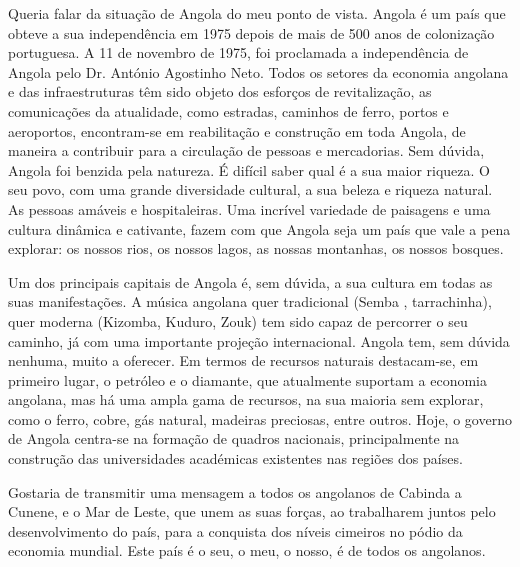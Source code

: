 Queria falar da situação de Angola do meu ponto de vista. Angola é um país que obteve a sua independência em 1975 depois de mais de 500 anos de colonização portuguesa. A 11 de novembro de 1975, foi proclamada a independência de Angola pelo Dr. António Agostinho Neto. 
Todos os setores da economia angolana e das infraestruturas têm sido objeto dos esforços de revitalização, as comunicações da atualidade, como estradas, caminhos de ferro, portos e aeroportos, encontram-se em reabilitação e construção em toda Angola, de maneira a contribuir para a circulação de pessoas e mercadorias. Sem dúvida, Angola foi benzida pela natureza. É difícil saber qual é a sua maior riqueza. O seu povo, com uma grande 
diversidade cultural, a sua beleza e riqueza natural. As pessoas amáveis e hospitaleiras. Uma incrível variedade de paisagens e uma cultura dinâmica e cativante, fazem com que Angola seja um país que vale a pena explorar: os nossos rios, os nossos lagos, as nossas montanhas, os nossos bosques.

 Um dos principais capitais de Angola é, sem dúvida, a sua cultura em todas as suas manifestações. A música angolana quer 
tradicional (Semba , tarrachinha), quer moderna (Kizomba, Kuduro, Zouk) tem sido capaz de percorrer o seu caminho, já com uma importante
projeção internacional. Angola tem, sem dúvida nenhuma, muito a oferecer. Em termos de recursos naturais destacam-se, em primeiro lugar, o petróleo e o diamante, que atualmente suportam a economia angolana, mas há uma ampla gama de recursos, na sua maioria sem explorar, como o ferro, cobre, gás natural, madeiras preciosas, entre outros. Hoje, o governo de Angola centra-se na formação de quadros nacionais, principalmente na construção das universidades académicas existentes nas regiões dos países.

Gostaria de transmitir uma mensagem a todos os angolanos de Cabinda a Cunene, e o Mar de Leste, que unem as suas forças, ao trabalharem juntos pelo desenvolvimento do país, para a conquista dos níveis cimeiros no pódio da economia mundial. Este país é o seu, o meu, o nosso, é de todos os angolanos.

\newpage




